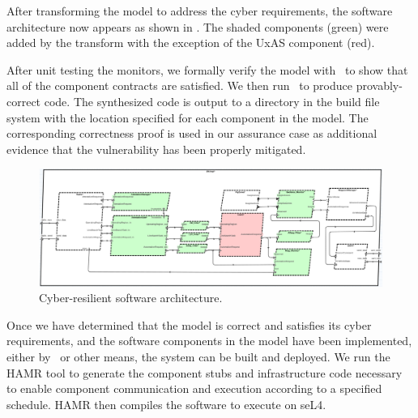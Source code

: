 After transforming the model to address the cyber requirements, the software architecture now appears as shown in .  The shaded components (green) were added by the transform with the exception of the UxAS component (red). 

After unit testing the monitors, we formally verify the model with \agr\ to show that all of the component contracts are satisfied.
We then run \splt\ to produce provably-correct code.
The synthesized code is output to a directory in the build file system with the location specified for each component in the model.  The corresponding correctness proof is used in our assurance case as additional evidence that the vulnerability has been properly mitigated.

\begin{figure}[h]
	\centering
	\includegraphics[width=1\columnwidth]{figs/hardened-sw.png}
	\caption{Cyber-resilient software architecture.}
	\label{fig:hardened-sw}
\end{figure}

Once we have determined that the model is correct and satisfies its cyber requirements, and the software components in the model have been implemented, either by \splt\ or other means, the system can be built and deployed.  We run the HAMR tool to generate the component stubs and infrastructure code necessary to enable component communication and execution according to a specified schedule.
%
HAMR then compiles the software to execute on seL4.

